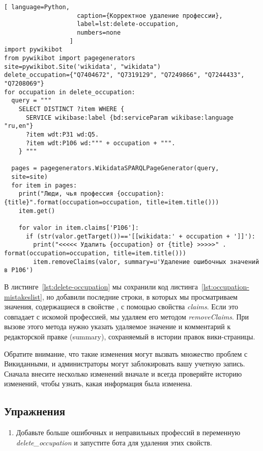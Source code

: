 \begin{fullwidth}
\begin{lstlisting}[ language=Python,
                    caption={Корректное удаление профессии},
                    label=lst:delete-occupation, 
                    numbers=none
                  ]
import pywikibot
from pywikibot import pagegenerators
site=pywikibot.Site('wikidata', "wikidata")
delete_occupation={"Q7404672", "Q7319129", "Q7249866", "Q7244433", 
"Q7208069"}
for occupation in delete_occupation:
  query = """
    SELECT DISTINCT ?item WHERE {
      SERVICE wikibase:label {bd:serviceParam wikibase:language "ru,en"}
      ?item wdt:P31 wd:Q5.
      ?item wdt:P106 wd:""" + occupation + """.
    } """

  pages = pagegenerators.WikidataSPARQLPageGenerator(query, 
  site=site)
  for item in pages:
    print("Люди, чья профессия {occupation}: {title}".format(occupation=occupation, title=item.title()))
    item.get()

    for valor in item.claims['P106']:
      if (str(valor.getTarget())=='[[wikidata:' + occupation + ']]'):
        print("<<<<< Удалить {occupation} от {title} >>>>>" . format(occupation=occupation, title=item.title()))
        item.removeClaims(valor, summary=u'Удаление ошибочных значений в P106')
\end{lstlisting} 
\end{fullwidth}

В листинге~\ref{lst:delete-occupation} мы сохранили код листинга~\ref{lst:occupation-mistakeslist}, но добавили последние строки, в которых мы просматриваем значения, содержащиеся в свойстве , с помощью свойства \textit{claims}. Если это совпадает с искомой профессией, мы удаляем его методом \textit{removeClaims}. При вызове этого метода нужно указать удаляемое значение и комментарий к редакторской правке (summary), сохраняемый в истории правок вики-страницы.

Обратите внимание, что такие изменения могут вызвать множество проблем с Викиданными, и администраторы могут заблокировать вашу учетную запись. Сначала внесите несколько изменений вначале и всегда проверяйте историю изменений, чтобы узнать, какая информация была изменена.

\subsection{Упражнения}

\begin{enumerate} 
\item Добавьте больше ошибочных и неправильных профессий в переменную \textit{delete\_occupation} и запустите бота для удаления этих свойств.
\end{enumerate}
